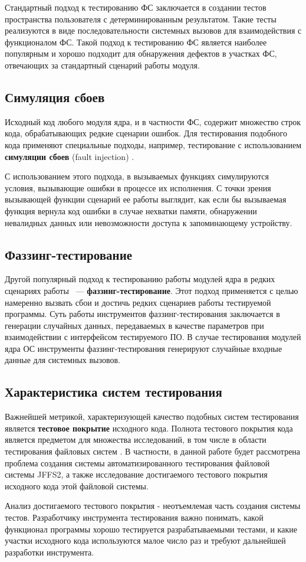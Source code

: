 Стандартный подход к тестированию ФС заключается в создании тестов пространства пользователя с детерминированным результатом. Такие тесты реализуются в виде последовательности системных вызовов для взаимодействия с функционалом ФС. Такой подход к тестированию ФС является наиболее популярным и хорошо подходит для обнаружения дефектов в участках ФС, отвечающих за стандартный сценарий работы модуля.

\subsection{Симуляция сбоев}

Исходный код любого модуля ядра, и в частности ФС, содержит множество строк кода, обрабатывающих редкие сценарии ошибок. Для тестирования подобного кода применяют специальные подходы, например, тестирование с использованием \textbf{симуляции сбоев} (fault injection) \cite{faultuse}.

С использованием этого подхода, в вызываемых функциях симулируются условия, вызывающие ошибки в процессе их исполнения. С точки зрения вызывающей функции сценарий ее работы выглядит, как если бы вызываемая функция вернула код ошибки в случае нехватки памяти, обнаружении невалидных данных или невозможности доступа к запоминающему устройству.

\subsection{Фаззинг-тестирование}

Другой популярный подход к тестированию работы модулей ядра в редких сценариях работы ~--- \textbf{фаззинг-тестирование}. Этот подход применяется с целью намеренно вызвать сбои и достичь редких сценариев работы тестируемой программы. Суть работы инструментов фаззинг-тестирования заключается в генерации случайных данных, передаваемых в качестве параметров при взаимодействии с интерфейсом тестируемого ПО. В случае тестирования модулей ядра ОС инструменты фаззинг-тестирования генерируют случайные входные данные для системных вызовов.

\subsection{Характеристика систем тестирования}

Важнейшей метрикой, характеризующей качество подобных систем тестирования является \textbf{тестовое покрытие} исходного кода. Полнота тестового покрытия кода является предметом для множества исследований, в том числе в области тестирования файловых систем \cite{xfscover}. В частности, в данной работе будет рассмотрена проблема создания системы автоматизированного тестирования файловой системы JFFS2, а также исследование достигаемого тестового покрытия исходного кода этой файловой системы.

Анализ достигаемого тестового покрытия - неотъемлемая часть создания системы тестов. Разработчику инструмента тестирования важно понимать, какой функционал программы хорошо тестируется разрабатываемыми тестами, и какие участки исходного кода используются малое число раз и требуют дальнейшей разработки инструмента.

\newpage
